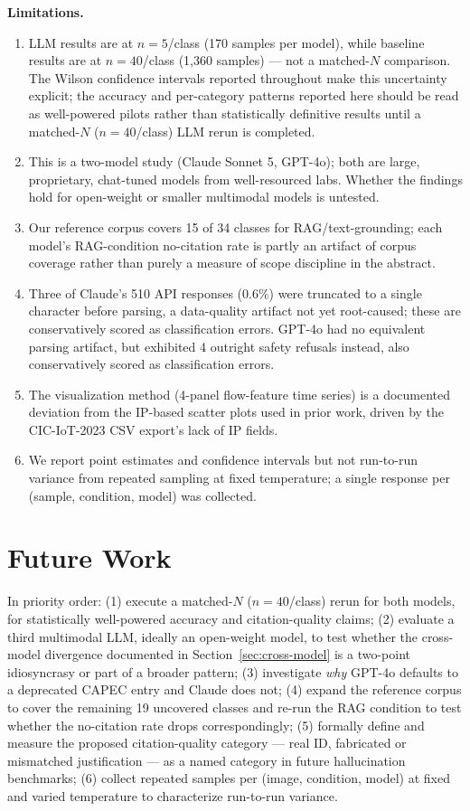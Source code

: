 \documentclass[10pt,twocolumn]{article}
\begin{document}
\textbf{Limitations.}
\begin{enumerate}[nosep]
\item LLM results are at $n{=}5$/class (170 samples per model), while baseline results are at $n{=}40$/class (1{,}360 samples) --- not a matched-$N$ comparison. The Wilson confidence intervals reported throughout make this uncertainty explicit; the accuracy and per-category patterns reported here should be read as well-powered pilots rather than statistically definitive results until a matched-$N$ ($n{=}40$/class) LLM rerun is completed.
\item This is a two-model study (Claude Sonnet 5, GPT-4o); both are large, proprietary, chat-tuned models from well-resourced labs. Whether the findings hold for open-weight or smaller multimodal models is untested.
\item Our reference corpus covers 15 of 34 classes for RAG/text-grounding; each model's RAG-condition no-citation rate is partly an artifact of corpus coverage rather than purely a measure of scope discipline in the abstract.
\item Three of Claude's 510 API responses (0.6\%) were truncated to a single character before parsing, a data-quality artifact not yet root-caused; these are conservatively scored as classification errors. GPT-4o had no equivalent parsing artifact, but exhibited 4 outright safety refusals instead, also conservatively scored as classification errors.
\item The visualization method (4-panel flow-feature time series) is a documented deviation from the IP-based scatter plots used in prior work, driven by the CIC-IoT-2023 CSV export's lack of IP fields.
\item We report point estimates and confidence intervals but not run-to-run variance from repeated sampling at fixed temperature; a single response per (sample, condition, model) was collected.
\end{enumerate}

\section{Future Work}

In priority order: (1) execute a matched-$N$ ($n{=}40$/class) rerun for both models, for statistically well-powered accuracy and citation-quality claims; (2) evaluate a third multimodal LLM, ideally an open-weight model, to test whether the cross-model divergence documented in Section~\ref{sec:cross-model} is a two-point idiosyncrasy or part of a broader pattern; (3) investigate \emph{why} GPT-4o defaults to a deprecated CAPEC entry and Claude does not; (4) expand the reference corpus to cover the remaining 19 uncovered classes and re-run the RAG condition to test whether the no-citation rate drops correspondingly; (5) formally define and measure the proposed citation-quality category --- real ID, fabricated or mismatched justification --- as a named category in future hallucination benchmarks; (6) collect repeated samples per (image, condition, model) at fixed and varied temperature to characterize run-to-run variance.
\end{document}
